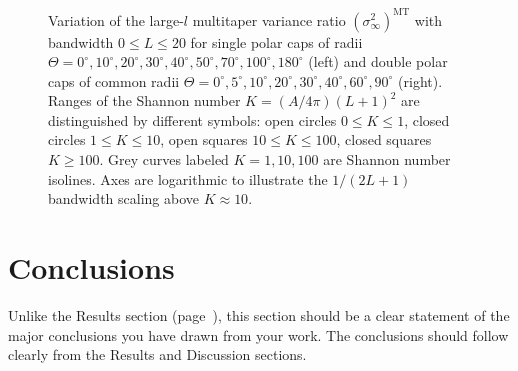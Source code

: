 \documentclass[11pt]{report}
\newcommand{\MT}{^{\mathrm{MT}}}
\newcommand{\Lpot}{(L+1)^2}
\begin{document}
\begin{figure}
\centering 
{} 
\caption[Variance ratio of multitaper estimates]{Variation of the large-$l$ multitaper variance ratio $(\sigma_{\infty}^2)\MT$ with bandwidth $0\leq L\leq 20$ for single polar caps of radii $\Theta=0^{\circ},10^{\circ},20^{\circ}, 30^{\circ},40^{\circ},50^{\circ},70^{\circ},100^{\circ},180^{\circ}$ (left) and double polar caps of common radii $\Theta=0^{\circ}, 5^{\circ}, 10^{\circ}, 20^{\circ},30^{\circ},40^{\circ},60^{\circ},90^{\circ}$ (right). Ranges of the Shannon number $K=(A/4\pi)\Lpot$ are distinguished by different symbols: open circles $0\leq K\leq 1$, closed circles $1\leq K\leq 10$, open squares $10\leq K\leq 100$, closed squares $K\geq 100$. Grey curves labeled \mbox{$K=1,10,100$} are Shannon number  isolines. Axes are logarithmic to illustrate the $1/(2L+1)$ bandwidth scaling above $K\approx 10$. \label{MTvarfig2}}
\end{figure}

\section{Conclusions \label{sec:conclusions}}
Unlike the Results section (page~\pageref{sec:results}), this section should be a clear statement of the major conclusions you have drawn from your work. The conclusions should follow clearly from the Results and Discussion sections. 

\small
\renewcommand{\bibsep}{0em}

\renewcommand{\bibname}{References}


\end{document}
